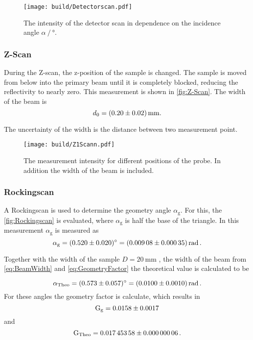 \begin{figure}[H]
    \centering
    \texttt{[image: build/Detectorscan.pdf]}
    \caption{The intensity of the detector scan in dependence on the incidence angle $\alpha \mathbin{/} \unit{\degree}$.}
    \label{fig:Detectorscan}
\end{figure}

\subsubsection{Z-Scan}

During the Z-scan, the z-position of the sample is changed. 
The sample is moved from below into the primary beam until it is completely blocked, reducing the reflectivity to nearly zero.
This measurement is shown in \autoref{fig:Z-Scan}.
The width of the beam is 
\begin{equation*}
    d_0 = \SI{0.20 \pm 0.02}{\milli\meter}.
    \label{eq:BeamWidth}
\end{equation*}

The uncertainty of the width is the distance between two measurement point.

\begin{figure}[H]
    \centering
    \texttt{[image: build/Z1Scann.pdf]}
    \caption{The measurement intensity for different positions of the probe. In addition the width of the beam is included.} 
    \label{fig:Z-Scan}
\end{figure}



\subsubsection{Rockingscan}

A Rockingscan is used to determine the geometry angle $\alpha_\text{g}$. 
For this, the \autoref{fig:Rockingscan} is evaluated, where $\alpha_\text{g}$ is half the base of the triangle.
In this measurement $\alpha_\text{g}$ is measured as 
\begin{equation*}
    \alpha_\text{g} = \SI{0.520 \pm 0.020}{\degree} = \SI{0.00908 \pm 0.00035}{\radian}\,.
\end{equation*}

Together with the width of the sample $D = \SI{20}{\milli\meter}$ \cite{v44}, the width of the beam from \autoref{eq:BeamWidth} and \autoref{eq:GeometryFactor} the theoretical value is calculated to be 

\begin{equation*}
    \alpha_\text{Theo}  = \SI{0.573 \pm 0.057}{\degree} = \SI{0.0100 \pm 0.0010}{\radian}\,.
\end{equation*}
For these angles the geometry factor is calculate, which results in 
\begin{equation*}
    \text{G}_\text{g} = \num{0.0158 \pm 0.0017}
\end{equation*}
and
\begin{equation*}
    \text{G}_\text{Theo}  = \num{0.01745358 \pm 0.00000006}\,.
\end{equation*}







